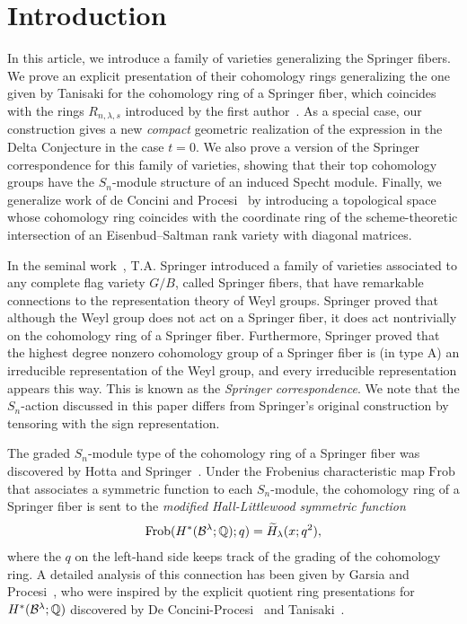 \documentclass[12pt]{amsart}
\newcommand{\Frob}{\mathrm{Frob}}
\begin{document}
\section{Introduction}\label{sec:Introduction}
In this article, we introduce a family of varieties generalizing the Springer fibers. We prove an explicit presentation of their cohomology rings generalizing the one given by Tanisaki for the cohomology ring of a Springer fiber, which coincides with the rings $R_{n,\lambda,s}$ introduced by the first author~\cite{GriffinOSP}. As a special case, our construction gives a new \emph{compact} geometric realization of the  expression in the Delta Conjecture in the case $t=0$. We also prove a version of the Springer correspondence for this family of varieties, showing that their top cohomology groups have the $S_n$-module structure of an induced Specht module. Finally, we generalize work of de Concini and Procesi~\cite{dCP} by introducing a topological space whose cohomology ring coincides with the coordinate ring of the scheme-theoretic intersection of an Eisenbud--Saltman rank variety with diagonal matrices. 




In the seminal work~\cite{Springer-TrigSum,Springer-WeylGrpReps}, T.A. Springer introduced a family of varieties associated to any complete flag variety $G/B$, called Springer fibers, that have remarkable connections to the representation theory of Weyl groups. Springer proved that although the Weyl group does not act on a Springer fiber, it does act nontrivially on the cohomology ring of a Springer fiber. Furthermore, Springer proved that the highest degree nonzero cohomology group of a Springer fiber is (in type A) an irreducible representation of the Weyl group, and every irreducible representation appears this way. This is known as the \emph{Springer correspondence}. We note that the $S_n$-action discussed in this paper differs from Springer's original construction by tensoring with the sign representation.

The graded $S_n$-module type of the cohomology ring of a Springer fiber was discovered by Hotta and Springer~\cite{Hotta-Springer}. Under the Frobenius characteristic map $\Frob$ that associates a symmetric function to each $S_n$-module, the cohomology ring of a Springer fiber is sent to the \emph{modified Hall-Littlewood symmetric function}
\begin{align}
\Frob(H^*(\cB^\lambda;\bQ);q) = \widetilde H_\lambda(x;q^2),
\end{align}
where the $q$ on the left-hand side keeps track of the grading of the cohomology ring. A detailed analysis of this connection has been given by Garsia and Procesi~\cite{Garsia-Procesi}, who were inspired by the explicit quotient ring presentations for $H^*(\mathcal{B}^\lambda;\mathbb{Q})$ discovered by De Concini-Procesi~\cite{dCP} and Tanisaki~\cite{Tanisaki}.
\end{document}
